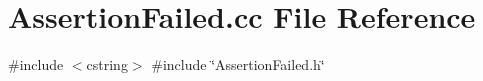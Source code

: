 \section{Assertion\+Failed.\+cc File Reference}
\label{AssertionFailed_8cc}
{\ttfamily \#include $<$cstring$>$}\newline
{\ttfamily \#include \char`\"{}Assertion\+Failed.\+h\char`\"{}}\newline
